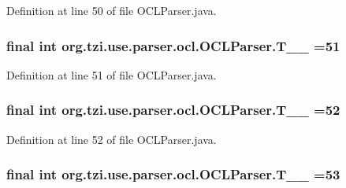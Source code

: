 Definition at line 50 of file O\-C\-L\-Parser.\-java.

\hypertarget{classorg_1_1tzi_1_1use_1_1parser_1_1ocl_1_1_o_c_l_parser_a199137d27d43095420daac9068f5377f}{
\subsubsection[{T\-\_\-\-\_\-51}]{\setlength{\rightskip}{0pt plus 5cm}final int org.\-tzi.\-use.\-parser.\-ocl.\-O\-C\-L\-Parser.\-T\-\_\-\-\_ =51\hspace{0.3cm}{\ttfamily [static]}}}\label{classorg_1_1tzi_1_1use_1_1parser_1_1ocl_1_1_o_c_l_parser_a199137d27d43095420daac9068f5377f}


Definition at line 51 of file O\-C\-L\-Parser.\-java.

\hypertarget{classorg_1_1tzi_1_1use_1_1parser_1_1ocl_1_1_o_c_l_parser_a94063e95a0e36957443a0f79a31b2d97}{
\subsubsection[{T\-\_\-\-\_\-52}]{\setlength{\rightskip}{0pt plus 5cm}final int org.\-tzi.\-use.\-parser.\-ocl.\-O\-C\-L\-Parser.\-T\-\_\-\-\_ =52\hspace{0.3cm}{\ttfamily [static]}}}\label{classorg_1_1tzi_1_1use_1_1parser_1_1ocl_1_1_o_c_l_parser_a94063e95a0e36957443a0f79a31b2d97}


Definition at line 52 of file O\-C\-L\-Parser.\-java.

\hypertarget{classorg_1_1tzi_1_1use_1_1parser_1_1ocl_1_1_o_c_l_parser_a8677817a551872b0c68ffe3bd7c9a981}{
\subsubsection[{T\-\_\-\-\_\-53}]{\setlength{\rightskip}{0pt plus 5cm}final int org.\-tzi.\-use.\-parser.\-ocl.\-O\-C\-L\-Parser.\-T\-\_\-\-\_ =53\hspace{0.3cm}{\ttfamily [static]}}}\label{classorg_1_1tzi_1_1use_1_1parser_1_1ocl_1_1_o_c_l_parser_a8677817a551872b0c68ffe3bd7c9a981}


